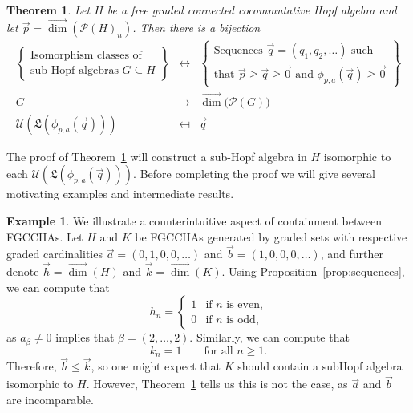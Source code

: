 \documentclass[11pt]{amsart}
\newtheorem{thm}{Theorem}
\theoremstyle{definition}
\newtheorem{example}[theorem]{Example}
\numberwithin{equation}{section}
\newcommand{\FGCCHAs}{\textsf{FGCCHA}s\xspace}
\newcommand{\vecdim}{\overrightarrow{\dim}}
\begin{document}
\begin{thm}
\label{thm:subclassification2}
Let $H$ be a free graded connected cocommutative Hopf algebra and let $\vec{p} = \vecdim(\mathcal{P}(H)_{n})$.  Then there is a bijection
\[
\begin{array}{rcl}
\left\{\begin{array}{c}
\text{Isomorphism classes of} \\
\text{sub-Hopf algebras $G \subseteq H$}
\end{array}\right\}
& \leftrightarrow & 
\left\{\begin{array}{c}
\text{Sequences $\vec{q} = (q_{1}, q_{2}, \ldots)$ such } \\
\text{that $\vec{p} \ge \vec{q} \ge \vec{0}$ and $\phi_{p, a}(\vec{q}) \ge \vec{0}$} 
\end{array}\right\} \\[2em]
G & \mapsto & \vecdim\big(\mathcal{P}(G)\big) \\
\mathcal{U}(\mathfrak{L}(\phi_{p, a}(\vec{q}))) & \mapsfrom & \vec{q}
\end{array}
\]
\end{thm}

The proof of Theorem~\ref{thm:subclassification2} will construct a sub-Hopf algebra in $H$ isomorphic to each $\mathcal{U}(\mathfrak{L}(\phi_{p, a}(\vec{q})))$.  
Before completing the proof we will give several motivating examples and intermediate results.

\begin{example}
We illustrate a counterintuitive aspect of containment between \FGCCHAs. Let $H$ and $K$ be \FGCCHAs generated by graded sets with respective graded cardinalities $\vec{a}=(0,1,0,0,\dots)$ and $\vec{b}=(1,0,0,0,\dots)$, and further denote $\vec{h} = \vecdim(H)$ and $\vec{k} = \vecdim(K)$.
Using Proposition~\ref{prop:sequences}, we can compute that
\[
h_n = \begin{cases} 1 & \text{if $n$ is even,} \\ 0 & \text{if $n$ is odd,} \end{cases}
\]
as $a_{\beta} \neq 0$ implies that $\beta = (2, \ldots, 2)$.  Similarly, we can compute that
\[
k_{n} = 1 \qquad\text{for all $n \ge 1$}.
\]
Therefore, $\vec{h} \le \vec{k}$, so one might expect that $K$ should contain a subHopf algebra isomorphic to $H$.  However, Theorem~\ref{thm:subclassification2} tells us this is not the case, as $\vec{a}$ and $\vec{b}$ are incomparable.
\end{example}
\end{document}
